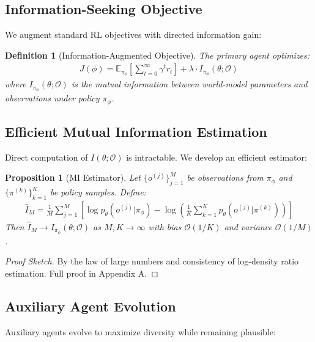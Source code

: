 \documentclass[12pt, a4paper]{article}
\newtheorem{definition}{Definition}
\newtheorem{proposition}{Proposition}
\begin{document}
\subsection{Information-Seeking Objective}

We augment standard RL objectives with directed information gain:

\begin{definition}[Information-Augmented Objective]
The primary agent optimizes:
\begin{align}
J(\phi) = \mathbb{E}_{\pi_\phi}\left[\sum_{t=0}^{\infty} \gamma^t r_t\right] + \lambda \cdot I_{\pi_\phi}(\theta; \mathcal{O})
\end{align}
where $I_{\pi_\phi}(\theta; \mathcal{O})$ is the mutual information between world-model parameters and observations under policy $\pi_\phi$.
\end{definition}

\subsection{Efficient Mutual Information Estimation}

Direct computation of $I(\theta; \mathcal{O})$ is intractable. We develop an efficient estimator:

\begin{proposition}[MI Estimator]\label{prop:estimator}
Let $\{o^{(j)}\}_{j=1}^M$ be observations from $\pi_\phi$ and $\{\pi^{(k)}\}_{k=1}^K$ be policy samples. Define:
\begin{align}
\hat{I}_M = \frac{1}{M} \sum_{j=1}^M \left[\log p_\theta(o^{(j)} | \pi_\phi) - \log \left(\frac{1}{K} \sum_{k=1}^K p_\theta(o^{(j)} | \pi^{(k)})\right)\right]
\end{align}
Then $\hat{I}_M \rightarrow I_{\pi_\phi}(\theta; \mathcal{O})$ as $M, K \rightarrow \infty$ with bias $\mathcal{O}(1/K)$ and variance $\mathcal{O}(1/M)$.
\end{proposition}

\begin{proof}[Proof Sketch]
By the law of large numbers and consistency of log-density ratio estimation. Full proof in Appendix A.
\end{proof}

\subsection{Auxiliary Agent Evolution}

Auxiliary agents evolve to maximize diversity while remaining plausible:
\end{document}
